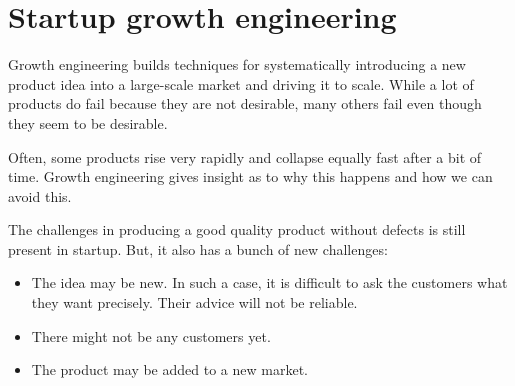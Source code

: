 \documentclass[a4paper, openany]{memoir}
\begin{document}
\chapter{Startup growth engineering}
Growth engineering builds techniques for systematically introducing a new product idea into a large-scale market and driving it to scale. While a lot of products do fail because they are not desirable, many others fail even though they seem to be desirable. 

Often, some products rise very rapidly and collapse equally fast after a bit of time. Growth engineering gives insight as to why this happens and how we can avoid this.

The challenges in producing a good quality product without defects is still present in startup. But, it also has a bunch of new challenges:
\begin{itemize}
    \item The idea may be new. In such a case, it is difficult to ask the customers what they want precisely. Their advice will not be reliable.
    \item There might not be any customers yet.
    \item The product may be added to a new market.
\end{itemize}
\end{document}
